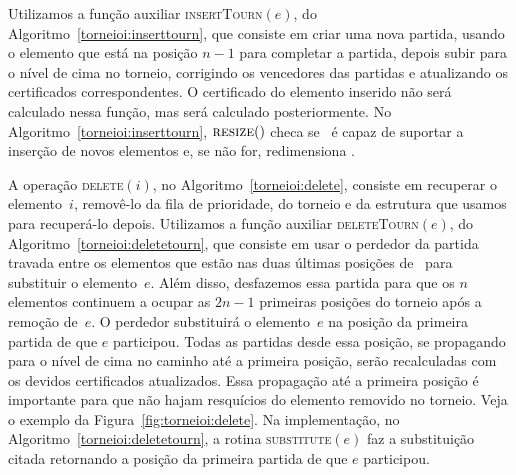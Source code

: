 



Utilizamos a função auxiliar \textsc{insertTourn}$(e)$, do Algoritmo~\ref{torneioi:inserttourn},
que consiste em criar uma nova partida, usando o elemento que está na posição $n-1$ para completar
a partida, depois subir para o nível de cima no torneio, corrigindo os vencedores das partidas e
atualizando os certificados correspondentes.
O certificado do elemento inserido não será calculado nessa função, mas será calculado
posteriormente.
No Algoritmo~\ref{torneioi:inserttourn}, $\textsc{resize}()$ checa se \torneio~é capaz de suportar
a inserção de novos elementos e, se não for, redimensiona \torneio.



A operação \textsc{delete}$(i)$, no Algoritmo~\ref{torneioi:delete}, consiste em recuperar o
elemento~$i$, removê-lo da fila de prioridade, do torneio e da estrutura que usamos para
recuperá-lo depois.
Utilizamos a função auxiliar \textsc{deleteTourn}$(e)$, do Algoritmo~\ref{torneioi:deletetourn},
que consiste em usar o perdedor da partida travada entre os elementos que estão nas duas últimas
posições de \torneio~para substituir o elemento~$e$.
Além disso, desfazemos essa partida para que os $n$ elementos continuem a ocupar as $2n - 1$
primeiras posições do torneio após a remoção de~$e$.
O perdedor substituirá o elemento~$e$ na posição da primeira partida de que $e$ participou.
Todas as partidas desde essa posição, se propagando para o nível de cima no caminho até a primeira
posição, serão recalculadas com os devidos certificados atualizados.
Essa propagação até a primeira posição é importante para que não hajam resquícios do elemento
removido no torneio.
Veja o exemplo da Figura~\ref{fig:torneioi:delete}.
Na implementação, no Algoritmo~\ref{torneioi:deletetourn}, a rotina \textsc{substitute}$(e)$ faz a
substituição citada retornando a posição da primeira partida de que $e$ participou.






